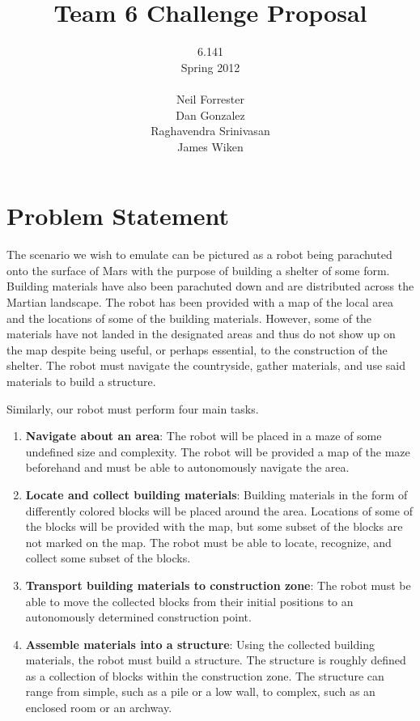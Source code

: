 \documentclass[letterpaper,11pt]{article}
\title{Team 6 Challenge Proposal}
\author{6.141\\
	Spring 2012\\ \\
	Neil Forrester\\
	Dan Gonzalez\\
	Raghavendra Srinivasan\\
	James Wiken}
\begin{document}
\begin{singlespacing}
\maketitle
\thispagestyle{empty}
\newpage

\tableofcontents
\listoffigures
\listoftables
\thispagestyle{empty}
\newpage

\end{singlespacing}

\setcounter{page}{1}

\section{Problem Statement}
The scenario we wish to emulate can be pictured as a robot being parachuted onto the surface of Mars with the purpose of building a shelter of some form.  Building materials have also been parachuted down and are distributed across the Martian landscape.  The robot has been provided with a map of the local area and the locations of some of the building materials.  However, some of the materials have not landed in the designated areas and thus do not show up on the map despite being useful, or perhaps essential, to the construction of the shelter.  The robot must navigate the countryside, gather materials, and use said materials to build a structure.

Similarly, our robot must perform four main tasks.  

\begin{enumerate}
 \item {\bf Navigate about an area}: The robot will be placed in a maze of some undefined size and complexity.  The robot will be provided a map of the maze beforehand and must be able to autonomously navigate the area.
 \item {\bf Locate and collect building materials}: Building materials in the form of differently colored blocks will be placed around the area.  Locations of some of the blocks will be provided with the map, but some subset of the blocks are not marked on the map.  The robot must be able to locate, recognize, and collect some subset of the blocks.
 \item {\bf Transport building materials to construction zone}: The robot must be able to move the collected blocks from their initial positions to an autonomously determined construction point.
 \item {\bf Assemble materials into a structure}: Using the collected building materials, the robot must build a structure.  The structure is roughly defined as a collection of blocks within the construction zone.  The structure can range from simple, such as a pile or a low wall, to complex, such as an enclosed room or an archway.  
\end{enumerate}
\end{document}
